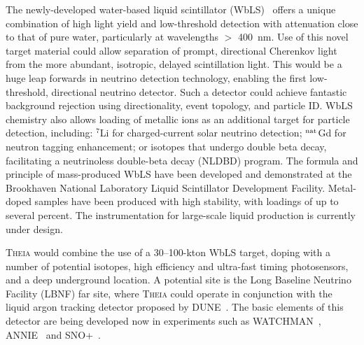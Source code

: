 The newly-developed water-based liquid scintillator (WbLS)~\cite{wbls} offers a unique combination of  high light yield and low-threshold detection with attenuation close to that of pure water, particularly at wavelengths $>$ 400~nm.  
Use of this novel target material could allow separation of prompt, directional Cherenkov light from the more abundant, isotropic, delayed scintillation light.  This would be a huge leap forwards in neutrino detection technology, enabling the first low-threshold, directional neutrino detector.  Such a detector could achieve fantastic background rejection using directionality, event topology, and particle ID.  
WbLS chemistry also allows loading of metallic ions as an additional target for
particle detection, including: $^7$Li for charged-current solar neutrino detection; $^{\rm nat}$Gd
for neutron tagging enhancement; 
or isotopes that undergo double beta decay, facilitating a
neutrinoless double-beta decay (NLDBD) program.  The formula and principle of mass-produced WbLS have been developed and demonstrated at the Brookhaven National Laboratory Liquid Scintillator Development Facility.  Metal-doped samples have been produced with high stability, with loadings of up to several percent.  The instrumentation for large-scale liquid production is currently under design.

\textsc{Theia} would combine the use of a 30--100-kton WbLS target, doping with a number of potential isotopes, high efficiency and ultra-fast
timing photosensors, and a deep underground location.  A potential site is the Long Baseline Neutrino Facility (LBNF) far site, where \textsc{Theia} could operate in conjunction with the liquid argon tracking detector proposed by DUNE~\cite{dune}.  
The basic elements of this detector are being developed now in experiments such as WATCHMAN~\cite{wm}, ANNIE~\cite{annie} and SNO+~\cite{snopl}.  

